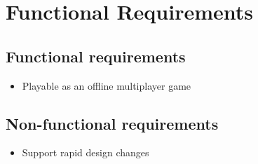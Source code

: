 \chapter{Functional Requirements}
\cite{adams1995hitchhiker}
\section{Functional requirements}
\begin{itemize}
	\item{Playable as an offline multiplayer game}
\end{itemize}

\section{Non-functional requirements}
\begin{itemize}
	\item{Support rapid design changes}
\end{itemize}
